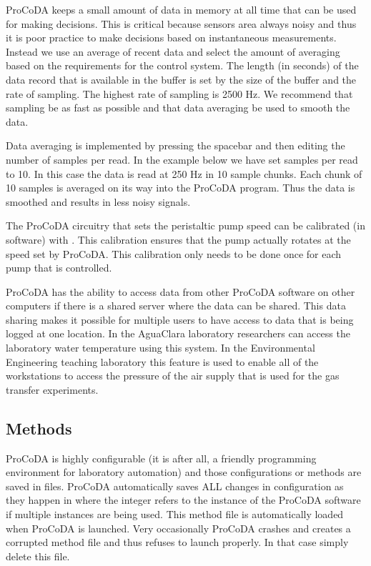 \documentclass[letterpaper,10pt,english]{sphinxmanual}
\begin{document}
ProCoDA keeps a small amount of data in memory at all time that can be used for making decisions. This is critical because sensors area always noisy and thus it is poor practice to make decisions based on instantaneous measurements. Instead we use an average of recent data and select the amount of averaging based on the requirements for the control system. The length (in seconds) of the data record that is available in the buffer is set by the size of the buffer and the rate of sampling. The highest rate of sampling is 2500 Hz. We recommend that sampling be as fast as possible and that data averaging be used to smooth the data.

Data averaging is implemented by pressing the spacebar and then editing the number of samples per read. In the example below we have set samples per read to 10. In this case the data is read at 250 Hz in 10 sample chunks. Each chunk of 10 samples is averaged on its way into the ProCoDA program. Thus the data is smoothed and results in less noisy signals.

The ProCoDA circuitry that sets the peristaltic pump speed can be calibrated (in software) with . This calibration ensures that the pump actually rotates at the speed set by ProCoDA. This calibration only needs to be done once for each pump that is controlled.

ProCoDA has the ability to access data from other ProCoDA software on other computers if there is a shared server where the data can be shared. This data sharing  makes it possible for multiple users to have access to data that is being logged at one location. In the AguaClara laboratory researchers can access the laboratory water temperature using this system. In the Environmental Engineering teaching laboratory this feature is used to enable all of the workstations to access the pressure of the air supply that is used for the gas transfer experiments.


\subsection{Methods}
\label{\detokenize{ProCoDA/ProCoDA:methods}}\label{\detokenize{ProCoDA/ProCoDA:heading-procoda-methods}}
ProCoDA is highly configurable (it is after all, a friendly programming environment for laboratory automation) and those configurations or methods are saved in files. ProCoDA automatically saves ALL changes in configuration as they happen in  where the integer refers to the instance of the ProCoDA software if multiple instances are being used. This method file is automatically loaded when ProCoDA is launched. Very occasionally ProCoDA crashes and creates a corrupted method file and thus refuses to launch properly. In that case simply delete this file.
\end{document}
